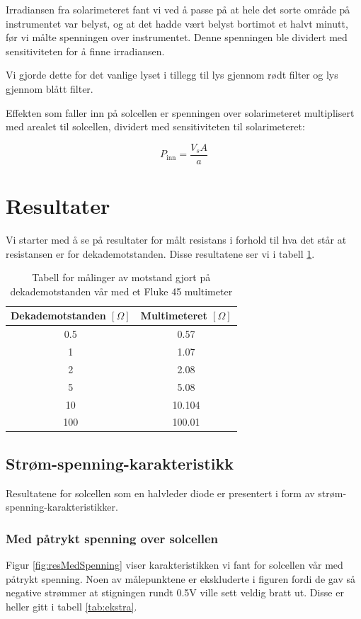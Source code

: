 \documentclass[a4paper,11pt, twocolumn]{article}
\begin{document}
Irradiansen fra solarimeteret fant vi ved å passe på at hele det sorte område på instrumentet var belyst, og at det hadde vært belyst bortimot et halvt minutt, før vi målte spenningen over instrumentet. Denne spenningen ble dividert med sensitiviteten for å finne irradiansen.

Vi gjorde dette for det vanlige lyset i tillegg til lys gjennom rødt filter og lys gjennom blått filter.

Effekten som faller inn på solcellen er spenningen over solarimeteret multiplisert med arealet til solcellen, dividert med sensitiviteten til solarimeteret:

\begin{equation}
	P_\text{inn} = \frac{V_sA}{a}
\end{equation}

\section{Resultater}
Vi starter med å se på resultater for målt resistans i forhold til hva det står at resistansen er for dekademotstanden. Disse resultatene ser vi i tabell \ref{tab:dekade}.

\begin{table}[!ht]
\caption{Tabell for målinger av motstand gjort på dekademotstanden vår med et Fluke 45 multimeter}
\label{tab:dekade}
\begin{tabular}{cc}
\toprule
\toprule
Dekademotstanden $[\Omega]$& Multimeteret $[\Omega]$\\
\hline
0.5 & 0.57 \\
1 & 1.07\\
2 & 2.08\\
5 & 5.08\\
10 & 10.104\\
100 & 100.01\\
\toprule
\end{tabular}
\end{table} 
\subsection{Strøm-spenning-karakteristikk}
Resultatene for solcellen som en halvleder diode er presentert i form av strøm-spenning-karakteristikker.
\subsubsection{Med påtrykt spenning over solcellen}
Figur \ref{fig:resMedSpenning} viser karakteristikken vi fant for solcellen vår med påtrykt spenning. Noen av målepunktene er ekskluderte i figuren fordi de gav så negative strømmer at stigningen rundt 0.5V ville sett veldig bratt ut. Disse er heller gitt i tabell \ref{tab:ekstra}.
\end{document}
